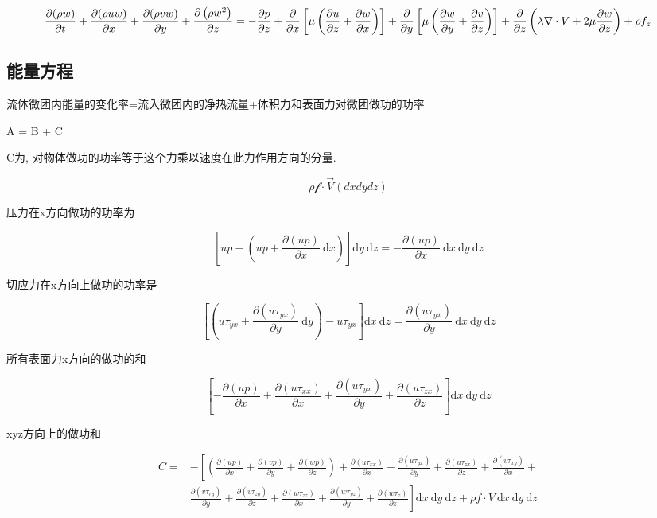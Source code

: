 \documentclass[UTF8]{ctexart}
\begin{document}
$$
	\frac{\partial(\rho w)}{\partial t}+\frac{\partial(\rho u w)}{\partial x}+\frac{\partial(\rho v w)}{\partial y}+\frac{\partial\left(\rho w^{2}\right)}{\partial z}=-\frac{\partial p}{\partial z}+\frac{\partial}{\partial x}\left[\mu\left(\frac{\partial u}{\partial z}+\frac{\partial w}{\partial x}\right)\right]+ \\
	\frac{\partial}{\partial y}\left[\mu\left(\frac{\partial w}{\partial y}+\frac{\partial v}{\partial z}\right)\right]+\frac{\partial}{\partial z}\left(\lambda \nabla \cdot V+2 \mu \frac{\partial w}{\partial z}\right)+\rho f_{z}
$$
\subsection{能量方程}

流体微团内能量的变化率=流入微团内的净热流量+体积力和表面力对微团做功的功率

A = B + C

C为, 对物体做功的功率等于这个力乘以速度在此力作用方向的分量.

$$
	\rho \mathcal{f} \cdot \vec{V} (dxdydz)
$$

压力在x方向做功的功率为

$$
	\left[u p-\left(u p+\frac{\partial(u p)}{\partial x} \mathrm{~d} x\right)\right] \mathrm{d} y \mathrm{~d} z=-\frac{\partial(u p)}{\partial x} \mathrm{~d} x \mathrm{~d} y \mathrm{~d} z
$$


切应力在x方向上做功的功率是

$$
	\left[\left(u \tau_{y x}+\frac{\partial\left(u \tau_{y x}\right)}{\partial y} \mathrm{~d} y\right)-u \tau_{y x}\right] \mathrm{d} x \mathrm{~d} z=\frac{\partial\left(u \tau_{y x}\right)}{\partial y} \mathrm{~d} x \mathrm{~d} y \mathrm{~d} z
$$

所有表面力x方向的做功的和

$$
	\left[-\frac{\partial(u p)}{\partial x}+\frac{\partial\left(u \tau_{x x}\right)}{\partial x}+\frac{\partial\left(u \tau_{y x}\right)}{\partial y}+\frac{\partial\left(u \tau_{z x}\right)}{\partial z}\right] \mathrm{d} x \mathrm{~d} y \mathrm{~d} z
$$

xyz方向上的做功和

$$
	\begin{aligned}
		C= & -\left[\left(\frac{\partial(u p)}{\partial x}+\frac{\partial(v p)}{\partial y}+\frac{\partial(w p)}{\partial z}\right)+\frac{\partial\left(u \tau_{x x}\right)}{\partial x}+\frac{\partial\left(u \tau_{y x}\right)}{\partial y}+\frac{\partial\left(u \tau_{z x}\right)}{\partial z}+\frac{\partial\left(v \tau_{x y}\right)}{\partial x}+\right.                                    \\
		   & \left.\frac{\partial\left(v \tau_{r y}\right)}{\partial y}+\frac{\partial\left(v \tau_{z y}\right)}{\partial z}+\frac{\partial\left(w \tau_{z z}\right)}{\partial x}+\frac{\partial\left(w \tau_{y z}\right)}{\partial y}+\frac{\partial\left(w \tau_{z}\right)}{\partial z}\right] \mathrm{d} x \mathrm{~d} y \mathrm{~d} z+\rho f \cdot V \mathrm{~d} x \mathrm{~d} y \mathrm{~d} z
	\end{aligned}
$$
\end{document}
